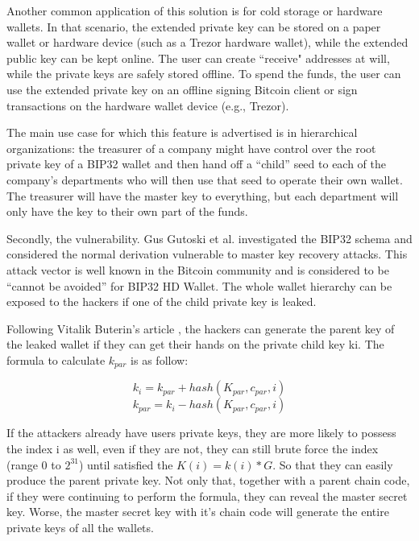     Another common application of this solution is for cold storage or hardware wallets. In that scenario, the extended private key can be stored on a paper wallet or hardware device (such as a Trezor hardware wallet), while the extended public key can be kept online. The user can create ``receive" addresses at will, while the private keys are safely stored offline. To spend the funds, the user can use the extended private key on an offline signing Bitcoin client or sign transactions on the hardware wallet device (e.g., Trezor).

    The main use case for which this feature is advertised is in hierarchical organizations: the treasurer of a company might have control over the root private key of a BIP32 wallet and then hand off a “child” seed to each of the company’s departments who will then use that seed to operate their own wallet. The treasurer will have the master key to everything, but each department will only have the key to their own part of the funds.

    \bigskip
    Secondly, the vulnerability. Gus Gutoski et al. \cite{DBLP:conf/fc/GutoskiS15} investigated the BIP32 schema and considered the normal derivation vulnerable to master key recovery attacks. This attack vector is well known in the Bitcoin community and is considered to be “cannot be avoided” for BIP32 HD Wallet. The whole wallet hierarchy can be exposed to the hackers if one of the child private key is leaked.

    Following Vitalik Buterin’s article \cite{Vitalik}, the hackers can generate the parent key of the leaked wallet if they can get their hands on the private child key ki. The formula to calculate $k_{par}$ is as follow:

    \begin{equation}
        k_i  = k_{par} + hash(K_{par}, c_{par}, i)
    \end{equation}
    \begin{equation}
        k_{par} = k_i - hash(K_{par}, c_{par}, i)
    \end{equation}

    \bigskip
    If the attackers already have users private keys, they are more likely to possess the index i as well, even if they are not, they can still brute force the index (range 0 to $2^{31}$) until satisfied the $K(i) = k(i) * G$. So that they can easily produce the parent private key. Not only that, together with a parent chain code, if they were continuing to perform the formula, they can reveal the master secret key. Worse, the master secret key with it’s chain code will generate the entire private keys of all the wallets.

